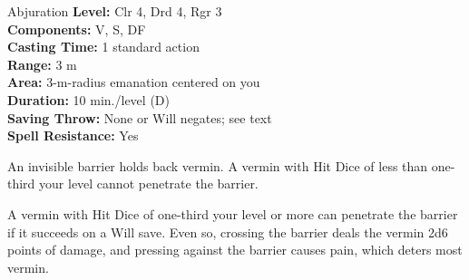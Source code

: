 {Abjuration}
{
	\textbf{Level:}
	Clr 4, Drd 4, Rgr 3\\
	\textbf{Components:}
	V, S, DF\\
	\textbf{Casting Time:}
	1 standard action\\
	\textbf{Range:}
	3 m\\
	\textbf{Area:}
	3-m-radius emanation centered on you\\
	\textbf{Duration:}
	10 min./level (D)\\
	\textbf{Saving Throw:}
	None or Will negates; see text\\
	\textbf{Spell Resistance:}
	Yes\\
}
{
	An invisible barrier holds back vermin. A vermin with Hit Dice of less than one-third your level cannot penetrate the barrier.

	A vermin with Hit Dice of one-third your level or more can penetrate the barrier if it succeeds on a Will save. Even so, crossing the barrier deals the vermin 2d6 points of damage, and pressing against the barrier causes pain, which deters most vermin.

}
